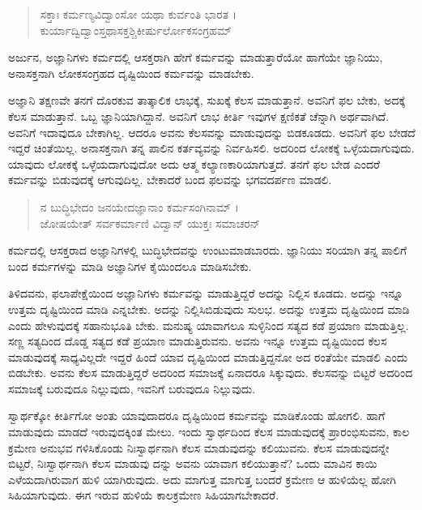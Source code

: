 \begin{verse}
ಸಕ್ತಾಃ ಕರ್ಮಣ್ಯವಿದ್ವಾಂಸೋ ಯಥಾ ಕುರ್ವಂತಿ ಭಾರತ ।\\ಕುರ್ಯಾದ್ವಿದ್ವಾಂಸ್ತಥಾಸಕ್ತಶ್ಚಿಕೀರ್ಷುರ್ಲೋಕಸಂಗ್ರಹಮ್ 
\end{verse}

{\small ಅರ್ಜುನ, ಅಜ್ಞಾನಿಗಳು ಕರ್ಮದಲ್ಲಿ ಆಸಕ್ತರಾಗಿ ಹೇಗೆ ಕರ್ಮವನ್ನು ಮಾಡುತ್ತಾರೆಯೋ ಹಾಗೆಯೇ ಜ್ಞಾನಿಯು, ಅನಾಸಕ್ತನಾಗಿ ಲೋಕಸಂಗ್ರಹದ ದೃಷ್ಟಿಯಿಂದ ಕರ್ಮವನ್ನು ಮಾಡಬೇಕು.}

ಅಜ್ಞಾನಿ ತಕ್ಷಣವೇ ತನಗೆ ದೊರಕುವ ತಾತ್ಕಾಲಿಕ ಲಾಭಕ್ಕೆ, ಸುಖಕ್ಕೆ ಕೆಲಸ ಮಾಡುತ್ತಾನೆ. ಅವನಿಗೆ ಫಲ ಬೇಕು, ಅದಕ್ಕೆ ಕೆಲಸ ಮಾಡುತ್ತಾನೆ. ಒಬ್ಬ ಜ್ಞಾನಿಯಾಗಿದ್ದಾನೆ. ಅವನಿಗೆ ಲಾಭ ಕೀರ್ತಿ ಇವುಗಳ ಕ್ಷಣಿಕತೆ ಚೆನ್ನಾಗಿ ಅರ್ಥವಾಗಿದೆ. ಅವನಿಗೆ ಇದಾವುದೂ ಬೇಕಾಗಿಲ್ಲ. ಆದರೂ ಅವನು ಕೆಲಸವನ್ನು ಮಾಡುವುದನ್ನು ಬಿಡಕೂಡದು. ಅವನಿಗೆ ಫಲ ಬೇಡದೆ ಇದ್ದರೆ ಚಿಂತೆಯಿಲ್ಲ. ಅನಾಸಕ್ತನಾಗಿ ತನ್ನ ಪಾಲಿನ ಕರ್ತವ್ಯವನ್ನು ನಿರ್ವಹಿಸಲಿ. ಅದರಿಂದ ಲೋಕಕ್ಕೆ ಒಳ್ಳೆಯದಾಗುವುದು. ಯಾವುದು ಲೋಕಕ್ಕೆ ಒಳ್ಳೆಯದಾಗುವುದೋ ಅದು ಆತ್ಮ ಕಲ್ಯಾಣಕಾರಿಯಾಗುತ್ತದೆ. ತನಗೆ ಫಲ ಬೇಡ ಎಂದರೆ ಕರ್ಮವನ್ನು ಬಿಡುವುದಕ್ಕೆ ಆಗುವುದಿಲ್ಲ. ಬೇಕಾದರೆ ಬಂದ ಫಲವನ್ನು ಭಗವದರ್ಪಣ ಮಾಡಲಿ.

\begin{verse}
ನ ಬುದ್ಧಿಭೇದಂ ಜನಯೇದಜ್ಞಾನಾಂ ಕರ್ಮಸಂಗಿನಾಮ್ ।\\ಜೋಷಯೇತ್ ಸರ್ವಕರ್ಮಾಣಿ ವಿದ್ವಾನ್ ಯುಕ್ತಃ ಸಮಾಚರನ್ 
\end{verse}

{\small ಕರ್ಮದಲ್ಲಿ ಆಸಕ್ತರಾದ ಅಜ್ಞಾನಿಗಳಲ್ಲಿ ಬುದ್ಧಿಭೇದವನ್ನು ಉಂಟುಮಾಡಬಾರದು. ಜ್ಞಾನಿಯು ಸರಿಯಾಗಿ ತನ್ನ ಪಾಲಿಗೆ ಬಂದ ಕರ್ಮಗಳನ್ನು ಮಾಡಿ ಅಜ್ಞಾನಿಗಳ ಕೈಯಿಂದಲೂ ಮಾಡಿಸಬೇಕು.}

ತಿಳಿದವನು, ಫಲಾಪೇಕ್ಷೆಯಿಂದ ಅಜ್ಞಾನಿಗಳು ಕರ್ಮವನ್ನು ಮಾಡುತ್ತಿದ್ದರೆ ಅದನ್ನು ನಿಲ್ಲಿಸ ಕೂಡದು. ಅದನ್ನು ಇನ್ನೂ ಉತ್ತಮ ದೃಷ್ಟಿಯಿಂದ ಮಾಡಿ ಎನ್ನಬೇಕು. ಅದನ್ನು ನಿಲ್ಲಿಸಿಬಿಡುವುದು ಸುಲಭ. ಅದನ್ನು ಉತ್ತಮ ದೃಷ್ಟಿಯಿಂದ ಮಾಡಿ ಎಂದು ಹೇಳುವುದಕ್ಕೆ ಸಹಾನುಭೂತಿ ಬೇಕು. ಮನುಷ್ಯ ಯಾವಾಗಲೂ ಸುಳ್ಳಿನಿಂದ ಸತ್ಯದ ಕಡೆ ಪ್ರಯಾಣ ಮಾಡುತ್ತಿಲ್ಲ. ಸಣ್ಣ ಸತ್ಯದಿಂದ ದೊಡ್ಡ ಸತ್ಯದ ಕಡೆ ಪ್ರಯಾಣ ಮಾಡುತ್ತಿರುವನು. ಅವನು ಇನ್ನೂ ಉತ್ತಮ ದೃಷ್ಟಿಯಿಂದ ಕೆಲಸ ಮಾಡುವುದಕ್ಕೆ ಸಾಧ್ಯವಿಲ್ಲದೇ ಇದ್ದರೆ ಹಿಂದೆ ಯಾವ ದೃಷ್ಟಿಯಿಂದ ಮಾಡುತ್ತಿದ್ದನೋ ಅದ ರಂತೆಯೇ ಮಾಡಲಿ ಎಂದು ಬಿಡಬೇಕು. ಅವನು ಕೆಲಸ ಮಾಡುತ್ತಿದ್ದರೆ ಅದರಿಂದ ಸಮಾಜಕ್ಕೆ ಏನಾದರೂ ಸಿಕ್ಕುವುದು. ಕೆಲಸವನ್ನು ಬಿಟ್ಟರೆ ಅದರಿಂದ ಸಮಾಜಕ್ಕೆ ಬರುವುದೂ ನಿಲ್ಲುವುದು, ಇವನಿಗೆ ಬರುವುದೂ ನಿಲ್ಲುವುದು.

ಸ್ವಾರ್ಥಕ್ಕೋ ಕೀರ್ತಿಗೋ ಅಂತು ಯಾವುದಾದರೂ ದೃಷ್ಟಿಯಿಂದ ಕರ್ಮವನ್ನು ಮಾಡಿಕೊಂಡು ಹೋಗಲಿ. ಹಾಗೆ ಮಾಡುವುದು ಮಾಡದೆ ಇರುವುದಕ್ಕಿಂತ ಮೇಲು. ಇಂದು ಸ್ವಾರ್ಥದಿಂದ ಕೆಲಸ ಮಾಡುವುದಕ್ಕೆ ಪ್ರಾರಂಭಿಸುವನು, ಕಾಲ ಕ್ರಮೇಣ ಅನುಭವ ಗಳಿಸಿಕೊಂಡು ನಿಃಸ್ವಾರ್ಥನಾಗಿ ಕೆಲಸ ಮಾಡುವುದನ್ನು ಕಲಿಯುವನು. ಕೆಲಸ ಮಾಡುವುದನ್ನೇ ಬಿಟ್ಟರೆ, ನಿಃಸ್ವಾರ್ಥನಾಗಿ ಕೆಲಸ ಮಾಡುವು ದನ್ನು ಅವನು ಯಾವಾಗ ಕಲಿಯುತ್ತಾನೆ? ಒಂದು ಮಾವಿನ ಕಾಯಿ ಎಳೆಯದಾಗಿರುವಾಗ ಹುಳಿ ಯಾಗಿರುವುದು. ಅದು ಮಾಗುತ್ತ ಮಾಗುತ್ತ ಬಂದರೆ ಕ್ರಮೇಣ ಆ ಹುಳಿಯೆಲ್ಲ ಹೋಗಿ ಸಿಹಿಯಾಗುವುದು. ಈಗ ಇರುವ ಹುಳಿಯೆ ಕಾಲಕ್ರಮೇಣ ಸಿಹಿಯಾಗಬೇಕಾದರೆ.

